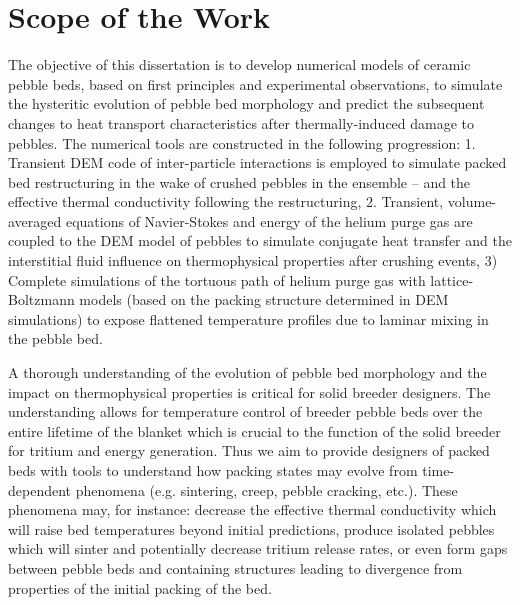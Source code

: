 \section{Scope of the Work}\label{sec:intro-scope-of-work}
The objective of this dissertation is to develop numerical models of ceramic pebble beds, based on first principles and experimental observations, to simulate the hysteritic evolution of pebble bed morphology and predict the subsequent changes to heat transport characteristics after thermally-induced damage to pebbles. The numerical tools are constructed in the following progression: 1. Transient DEM code of inter-particle interactions is employed to simulate packed bed restructuring in the wake of crushed pebbles in the ensemble -- and the effective thermal conductivity following the restructuring, 2. Transient, volume-averaged equations of Navier-Stokes and energy of the helium purge gas are coupled to the DEM model of pebbles to simulate conjugate heat transfer and the interstitial fluid influence on thermophysical properties after crushing events, 3) Complete simulations of the tortuous path of helium purge gas with lattice-Boltzmann models (based on the packing structure determined in DEM simulations) to expose flattened temperature profiles due to laminar mixing in the pebble bed. 

A thorough understanding of the evolution of pebble bed morphology and the impact on thermophysical properties is critical for solid breeder designers. The understanding allows for temperature control of breeder pebble beds over the entire lifetime of the blanket which is crucial to the function of the solid breeder for tritium and energy generation. Thus we aim to provide designers of packed beds with tools to understand how packing states may evolve from time-dependent phenomena (e.g. sintering, creep, pebble cracking, etc.). These phenomena may, for instance: decrease the effective thermal conductivity which will raise bed temperatures beyond initial predictions, produce isolated pebbles which will sinter and potentially decrease tritium release rates, or even form gaps between pebble beds and containing structures leading to divergence from properties of the initial packing of the bed.

